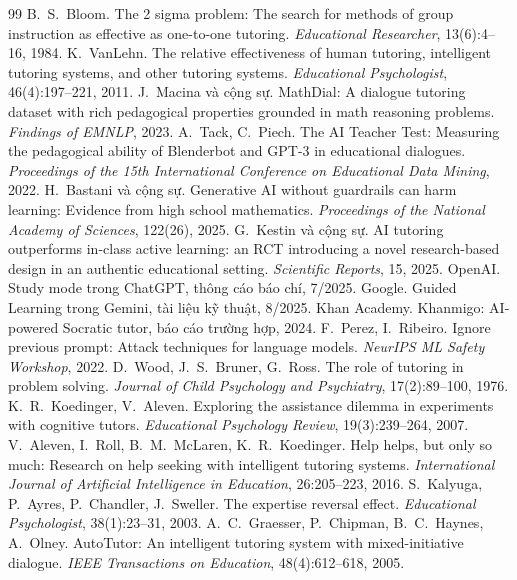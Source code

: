 \begin{thebibliography}{99}\scriptsize
\setlength{\itemsep}{0pt}\setlength{\parskip}{0pt}
 B.~S.~Bloom. The 2 sigma problem: The search for methods of group instruction as effective as one-to-one tutoring. \emph{Educational Researcher}, 13(6):4--16, 1984.
 K.~VanLehn. The relative effectiveness of human tutoring, intelligent tutoring systems, and other tutoring systems. \emph{Educational Psychologist}, 46(4):197--221, 2011.
 J.~Macina và cộng sự. MathDial: A dialogue tutoring dataset with rich pedagogical properties grounded in math reasoning problems. \emph{Findings of EMNLP}, 2023.
 A.~Tack, C.~Piech. The AI Teacher Test: Measuring the pedagogical ability of Blenderbot and GPT-3 in educational dialogues. \emph{Proceedings of the 15th International Conference on Educational Data Mining}, 2022.
 H.~Bastani và cộng sự. Generative AI without guardrails can harm learning: Evidence from high school mathematics. \emph{Proceedings of the National Academy of Sciences}, 122(26), 2025.
 G.~Kestin và cộng sự. AI tutoring outperforms in-class active learning: an RCT introducing a novel research-based design in an authentic educational setting. \emph{Scientific Reports}, 15, 2025.
 OpenAI. Study mode trong ChatGPT, thông cáo báo chí, 7/2025.
 Google. Guided Learning trong Gemini, tài liệu kỹ thuật, 8/2025.
 Khan Academy. Khanmigo: AI-powered Socratic tutor, báo cáo trường hợp, 2024.
 F.~Perez, I.~Ribeiro. Ignore previous prompt: Attack techniques for language models. \emph{NeurIPS ML Safety Workshop}, 2022.
 D.~Wood, J.~S.~Bruner, G.~Ross. The role of tutoring in problem solving. \emph{Journal of Child Psychology and Psychiatry}, 17(2):89--100, 1976.
 K.~R.~Koedinger, V.~Aleven. Exploring the assistance dilemma in experiments with cognitive tutors. \emph{Educational Psychology Review}, 19(3):239--264, 2007.
 V.~Aleven, I.~Roll, B.~M.~McLaren, K.~R.~Koedinger. Help helps, but only so much: Research on help seeking with intelligent tutoring systems. \emph{International Journal of Artificial Intelligence in Education}, 26:205--223, 2016.
 S.~Kalyuga, P.~Ayres, P.~Chandler, J.~Sweller. The expertise reversal effect. \emph{Educational Psychologist}, 38(1):23--31, 2003.
 A.~C.~Graesser, P.~Chipman, B.~C.~Haynes, A.~Olney. AutoTutor: An intelligent tutoring system with mixed-initiative dialogue. \emph{IEEE Transactions on Education}, 48(4):612--618, 2005.

\end{thebibliography}

